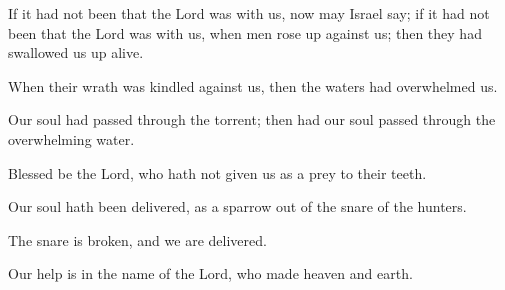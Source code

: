 If it had not been that the Lord was with us, now may Israel say; if it had not been that the Lord was with us, when men rose up against us; then they had swallowed us up alive.

When their wrath was kindled against us, then the waters had overwhelmed us.

Our soul had passed through the torrent; then had our soul passed through the overwhelming water.

Blessed be the Lord, who hath not given us as a prey to their teeth.

Our soul hath been delivered, as a sparrow out of the snare of the hunters.

The snare is broken, and we are delivered.

Our help is in the name of the Lord, who made heaven and earth.
